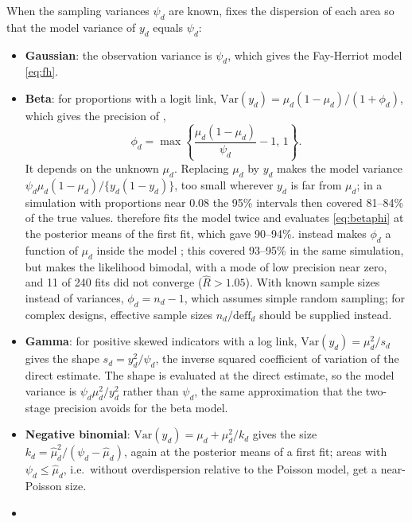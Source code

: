 When the sampling variances \(\psi_d\) are known,  fixes the dispersion of each area so that the model variance of \(y_d\) equals \(\psi_d\):

\begin{itemize}
\tightlist
\item
  \textbf{Gaussian}: the observation variance is \(\psi_d\), which gives the Fay-Herriot model \eqref{eq:fh}.
\item
  \textbf{Beta}: for proportions with a logit link, \(\mathrm{Var}(y_d) = \mu_d(1 - \mu_d)/(1 + \phi_d)\), which gives the precision of \citet{janicki2020properties},
  \begin{equation}
  \phi_d = \max\left\{\frac{\mu_d(1 - \mu_d)}{\psi_d} - 1, \, 1\right\}.
  \label{eq:betaphi}
  \end{equation}
  It depends on the unknown \(\mu_d\). Replacing \(\mu_d\) by \(y_d\) makes the model variance \(\psi_d\mu_d(1 - \mu_d)/\{y_d(1 - y_d)\}\), too small wherever \(y_d\) is far from \(\mu_d\); in a simulation with proportions near 0.08 the 95\% intervals then covered 81--84\% of the true values.  therefore fits the model twice and evaluates \eqref{eq:betaphi} at the posterior means of the first fit, which gave 90--94\%.  instead makes \(\phi_d\) a function of \(\mu_d\) inside the model \citep{denicolo2024tipsae}; this covered 93--95\% in the same simulation, but makes the likelihood bimodal, with a mode of low precision near zero, and 11 of 240 fits did not converge (\(\hat{R} > 1.05\)). With known sample sizes instead of variances, \(\phi_d = n_d - 1\), which assumes simple random sampling; for complex designs, effective sample sizes \(n_d/\mathrm{deff}_d\) should be supplied instead.
\item
  \textbf{Gamma}: for positive skewed indicators with a log link, \(\mathrm{Var}(y_d) = \mu_d^2/s_d\) gives the shape \(s_d = y_d^2/\psi_d\), the inverse squared coefficient of variation of the direct estimate. The shape is evaluated at the direct estimate, so the model variance is \(\psi_d\mu_d^2/y_d^2\) rather than \(\psi_d\), the same approximation that the two-stage precision avoids for the beta model.
\item
  \textbf{Negative binomial}: \(\mathrm{Var}(y_d) = \mu_d + \mu_d^2/k_d\) gives the size \(k_d = \hat{\mu}_d^2/(\psi_d - \hat{\mu}_d)\), again at the posterior means of a first fit; areas with \(\psi_d \le \hat{\mu}_d\), i.e.~without overdispersion relative to the Poisson model, get a near-Poisson size.
\item

\end{itemize}
